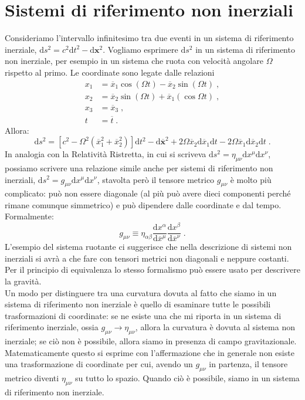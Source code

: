 \documentclass[12pt,a4paper]{report}
\theoremstyle{definition}
\newcommand{\diff}[1][]{\mathrm{d}#1}
\begin{document}
\section{Sistemi di riferimento non inerziali}
Consideriamo l'intervallo infinitesimo tra due eventi in un sistema di riferimento inerziale, $\diff{s^2}=c^2\diff{t^2}-\diff{\mathbf{x}^2}$. Vogliamo esprimere $\diff{s^2}$ in un sistema di riferimento non inerziale, per esempio in un sistema che ruota con velocità angolare $\Omega$ rispetto al primo. Le coordinate sono legate dalle relazioni
\begin{align*}
x_1 &=\overline{x}_1\cos(\Omega t)-\overline{x}_2\sin(\Omega t)\;, \\
x_2 &= \overline{x}_2\sin(\Omega t)+\overline{x}_1(\cos\Omega t)\;, \\
x_3 &= \overline{x}_3\;, \\
t &= \overline{t}\;.
\end{align*}
Allora:
\begin{equation}
\diff{s^2}=\left[c^2-\Omega^2(\overline{x}_1^2+\overline{x}_2^2)\right]\diff{t^2}-\diff{\overline{\mathbf{x}}^2}+2\Omega
\overline{x}_2\diff{\overline{x}_1}\diff{t}-2\Omega\overline{x}_1\diff{\overline{x}_2}\diff{t}\;.
\end{equation}
In analogia con la Relatività Ristretta, in cui si scriveva $\diff{s^2}=\eta_{\mu\nu}\diff{x^{\mu}}\diff{x^{\nu}}$, possiamo scrivere una relazione simile anche per sistemi di riferimento non inerziali, $\diff{s^2}=g_{\mu\nu}\diff{x^{\mu}}\diff{x^{\nu}}$, stavolta però il tensore metrico $g_{\mu\nu}$ è molto più complicato: può non essere diagonale (al più può avere dieci componenti perché rimane comunque simmetrico) e può dipendere dalle coordinate e dal tempo. Formalmente:
\begin{equation}
g_{\mu\nu}\equiv \eta_{\alpha\beta}\frac{\diff{x^{\alpha}}}{\diff{\overline{x}^{\mu}}}\frac{\diff{x^{\beta}}}{\diff{\overline{x}^{\nu}}}\;.
\end{equation}
L'esempio del sistema ruotante ci suggerisce che nella descrizione di sistemi non inerziali si avrà a che fare con tensori metrici non diagonali e neppure costanti. Per il principio di equivalenza lo stesso formalismo può essere usato per descrivere la gravità. \\
Un modo per distinguere tra una curvatura dovuta al fatto che siamo in un sistema di riferimento non inerziale è quello di esaminare tutte le possibili trasformazioni di coordinate: se ne esiste una che mi riporta in un sistema di riferimento inerziale, ossia $g_{\mu\nu}\to \eta_{\mu\nu}$, allora la curvatura è dovuta al sistema non inerziale; se ciò non è possibile, allora siamo in presenza di campo gravitazionale. Matematicamente questo si esprime con l'affermazione che in generale non esiste una trasformazione di coordinate per cui, avendo un $g_{\mu\nu}$ in partenza, il tensore metrico diventi $\eta_{\mu\nu}$ su tutto lo spazio. Quando ciò è possibile, siamo in un sistema di riferimento non inerziale. \\
\end{document}
